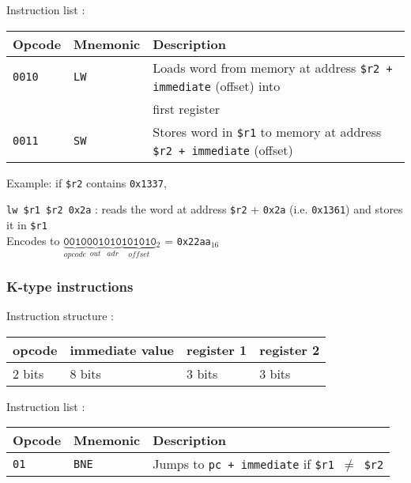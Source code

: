 \documentclass[a4paper]{report}
\begin{document}
Instruction list :

\begin{center}
	\begin{tabular}{|l|l|l|}
		\hline
		Opcode & Mnemonic & Description \\
		\hline \hline
		\texttt{0010} & \texttt{LW} & Loads word from memory at address
		                              \texttt{\$r2 + immediate} (offset) into \\
		              &             & first register \\
		\texttt{0011} & \texttt{SW} & Stores word in \texttt{\$r1} to memory at
		                           address \texttt{\$r2 + immediate} (offset) \\
		\hline
	\end{tabular}
\end{center}

Example: if \texttt{\$r2} contains \texttt{0x1337},

\texttt{lw \$r1 \$r2 0x2a} : reads the word at address \texttt{\$r2} +
\texttt{0x2a} (i.e. \texttt{0x1361}) and stores it in \texttt{\$r1} \\
Encodes to ${
	\underbrace{\texttt{0010}}_{opcode}
	\underbrace{\texttt{001}}_{out}
	\underbrace{\texttt{010}}_{adr}
	\underbrace{\texttt{101010}}_{offset}\mbox{}_2
}$ = \texttt{0x22aa}$_{16}$

\subsubsection{K-type instructions}

Instruction structure :

\begin{center}
	\begin{tabular}{|l|l|l|l|}
		\hline
		opcode & immediate value & register 1 & register 2 \\
		\hline
		2 bits & 8 bits & 3 bits & 3 bits \\
		\hline
	\end{tabular}
\end{center}

Instruction list :

\begin{center}
	\begin{tabular}{|l|l|l|}
		\hline
		Opcode & Mnemonic & Description \\
		\hline \hline
		\texttt{01} & \texttt{BNE} & Jumps to \texttt{pc + immediate} if
		                             \texttt{\$r1 $\neq$ \$r2} \\
		\hline
	\end{tabular}
\end{center}
\end{document}
